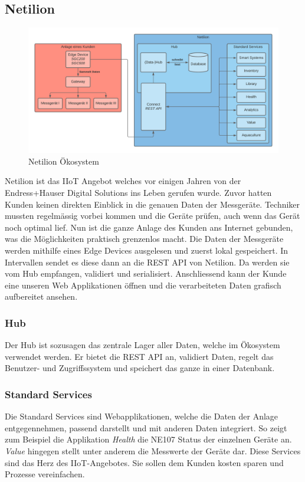 \subsection{Netilion} \label{arch-netilion}
\begin{figure}[!ht]
  \centering
  \includegraphics[width=.95\linewidth]{./images/Netilion.png}
  \caption[{Diagram Netilion Ökosystem von Jonas Schultheiss}]{Netilion Ökosystem}
  \label{fig:netilion}
\end{figure}
Netilion ist das IIoT Angebot welches vor einigen Jahren von der Endress+Hauser Digital Solutions ins Leben gerufen wurde. Zuvor hatten Kunden keinen direkten Einblick in die genauen Daten der Messgeräte. Techniker mussten regelmässig vorbei kommen und die Geräte prüfen, auch wenn das Gerät noch optimal lief. Nun ist die ganze Anlage des Kunden ans Internet gebunden, was die Möglichkeiten praktisch grenzenlos macht.
\newline
Die Daten der Messgeräte werden mithilfe eines Edge Devices ausgelesen und zuerst lokal gespeichert. In Intervallen sendet es diese dann an die REST API von Netilion. Da werden sie vom Hub empfangen, validiert und serialisiert. Anschliessend kann der Kunde eine unseren Web Applikationen öffnen und die verarbeiteten Daten grafisch aufbereitet ansehen.
\subsubsection{Hub}
Der Hub ist sozusagen das zentrale Lager aller Daten, welche im Ökosystem verwendet werden. Er bietet die REST API an, validiert Daten, regelt das Benutzer- und Zugriffssystem und speichert das ganze in einer Datenbank.
\subsubsection{Standard Services}
Die Standard Services sind Webapplikationen, welche die Daten der Anlage entgegennehmen, passend darstellt und mit anderen Daten integriert. So zeigt zum Beispiel die Applikation \textit{Health} die NE107 Status der einzelnen Geräte an. \textit{Value} hingegen stellt unter anderem die Messwerte der Geräte dar. Diese Services sind das Herz des IIoT-Angebotes. Sie sollen dem Kunden kosten sparen und Prozesse vereinfachen. 
